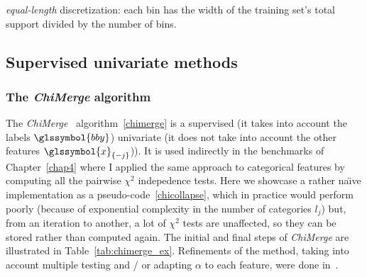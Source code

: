 \begin{algorithm}[H]
 \KwResult{$\hat{\q}$}
 \For{$j=1$ to $d$}{
Let $w_j = \max{i} x_{i,j} - \min{i} x_{i,j}$\;
Let $c_0=-\infty$, $c_{m_j} = + \infty$ and $c_{j,h} = \frac{w_j \cdot h}{m_j} + \min{i} x_{i,j}$\;
Let $C_{j,h} = ]c_{j,h-1};c_{j,h}]$ and $\hat{\q}_j(\cdot) = (\hat{q}_{j,h}(\cdot))_1^{m_j}$\;
Set $\hat{q}_{j,h}(\cdot)=\mathds{1}_{C_{j,h}}(\cdot)$.
}
 \caption{\label{equal-length-disc} \textit{equal-length} discretization: each bin has the width of the training set's total support divided by the number of bins.}
\end{algorithm}



\subsection{Supervised univariate methods}

\subsubsection{The \textit{ChiMerge} algorithm}

The \textit{ChiMerge}~\cite{kerber1992chimerge} algorithm~\ref{chimerge} is a supervised (it takes into account the labels $\glssymbol{bby}$) univariate (it does not take into account the other features $\glssymbol{x}_{\{-j\}}$)). It is used indirectly in the benchmarks of Chapter~\ref{chap4} where I applied the same approach to categorical features by computing all the pairwise $\chi^2$ indepedence tests. Here we showcase a rather na\"{\i}ve implementation as a pseudo-code~\ref{chicollapse}, which in practice would perform poorly (because of exponential complexity in the number of categories $l_j$) but, from an iteration to another, a lot of $\chi^2$ tests are unaffected, so they can be stored rather than computed again. The initial and final steps of \textit{ChiMerge} are illustrated in Table~\ref{tab:chimerge_ex}. Refinements of the method, taking into account multiple testing and / or adapting $\alpha$ to each feature, were done in~\cite{liu1995chi2,wang1998concurrent,tay2002modified,su2005extended}.

